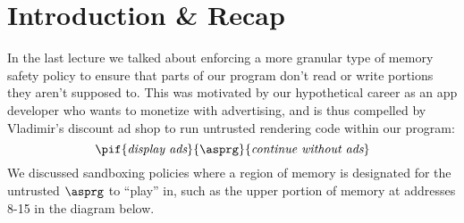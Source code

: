 \documentclass[11pt,twoside]{scrartcl}
\begin{document}
\newcommand{\atrace}{\sigma}%
\newcommand{\stdI}{\dTLint[state=\omega]}%
\newcommand{\Ip}{\dTLint[trace=\atrace]}%
\newcommand{\ws}{\omega}\newcommand{\wt}{\nu}%

\maketitle
\thispagestyle{empty}


\section{Introduction \& Recap}

In the last lecture we talked about enforcing a more granular type of memory safety policy to ensure that parts of our program don't read or write portions they aren't supposed to. This was motivated by our hypothetical career as an app developer who wants to monetize with advertising, and is thus compelled by Vladimir's discount ad shop to run untrusted rendering code within our program:
\[
\pif{\textit{display ads}}{\asprg}{\textit{continue without ads}}
\]
We discussed sandboxing policies where a region of memory is designated for the untrusted $\asprg$ to ``play'' in, such as the upper portion of memory at addresses 8-15 in the diagram below.
\end{document}

